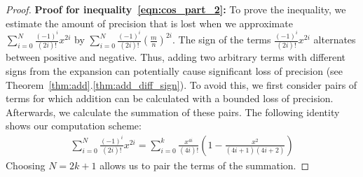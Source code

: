 \documentclass{article}
\numberwithin{mytheorem}{section}
\newcommand{\taylorcos}[3] {\sum_{i=#1}^{#2}\frac{(-1)^i}{(2i)!}{#3}^{2i}}
\begin{document}
\begin{proof}
\noindent\textbf{Proof for inequality~\eqref{eqn:cos_part_2}:} To prove the inequality, we estimate the amount of precision that is lost when we approximate $\taylorcos{0}{N}{x}$ by $\taylorcos{0}{N}{(\frac{m}{n})}$. The sign of the terms $\frac{(-1)^i}{(2i)!}x^{2i}$ alternates between positive and negative. Thus, adding two arbitrary terms with different signs from the expansion can potentially cause significant loss of precision (see Theorem~\ref{thm:add}.\ref{thm:add_diff_sign}). To avoid this, we first consider pairs of terms for which addition can be calculated with a bounded loss of precision. Afterwards, we calculate the summation of these pairs. The following identity shows our computation scheme:
\begin{align*}
\taylorcos{0}{N}{x}=\sum_{i=0}^{k}\frac{x^{4i}}{(4i)!}(1-\frac{x^2}{(4i+1)(4i+2)})
\end{align*}
Choosing $N=2k+1$ allows us to pair the terms of the summation. 


\end{proof}
\end{document}
